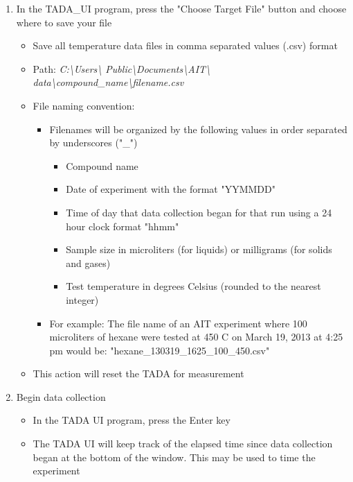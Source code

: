 \documentclass[letterpaper,11pt]{article}
\begin{document}
\begin{enumerate}
    \item In the TADA\_UI program, press the "Choose Target File" button and 
        choose where to save your file
        \begin{itemize}
        \item Save all temperature data files in comma separated values (.csv) 
            format
        \item Path: \textit{C:\textbackslash Users\textbackslash 
            Public\textbackslash Documents\textbackslash AIT\textbackslash 
            data\textbackslash compound\_name\textbackslash filename.csv}
        \item File naming convention: 
            \begin{itemize}
            \item Filenames will be organized by the following values in order 
                separated by underscores ("\_")
                    \begin{itemize}
                    \item Compound name
                    \item Date of experiment with the format "YYMMDD"
                    \item Time of day that data collection began for that run
                        using a 24 hour clock format "hhmm"
                    \item Sample size in microliters (for liquids) or milligrams
                        (for solids and gases)
                    \item Test temperature in degrees Celsius (rounded to the 
                        nearest integer)
                    \end{itemize}
                    
            \item For example: The file name of an AIT experiment where 100 
                microliters of hexane were tested at 450 \degree C on 
                March 19, 2013 at 4:25 pm would be: \newline
                "hexane\_130319\_1625\_100\_450.csv"
            \end{itemize}    
        \item This action will reset the TADA for measurement        
        \end{itemize}
    
    \item Begin data collection 
        \begin{itemize}
        \item In the TADA UI program, press the Enter key
        \item The TADA UI will keep track of the elapsed time since data 
          collection began at the bottom of the window. This may be used
          to time the experiment
        \end{itemize}
    

\end{enumerate}
\end{document}

